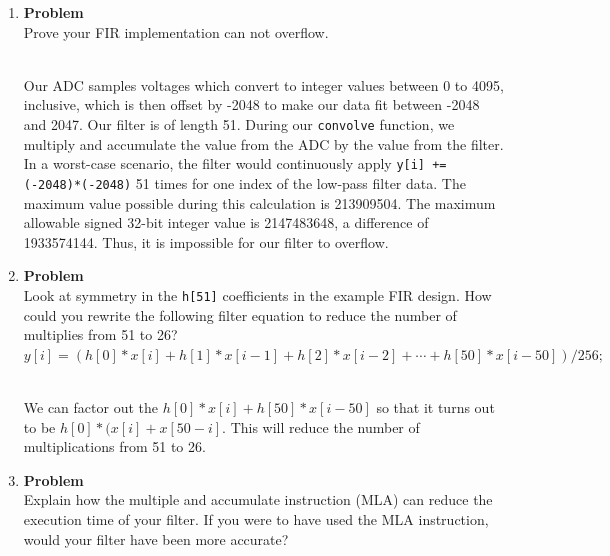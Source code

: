 \documentclass[12pt]{article}
\newenvironment{Ex}{\textbf{Problem}\vspace{.25em}\\}{}
\newcommand{\hbr}{\hfill\vspace{.25em}\\}
\begin{document}
\begin{enumerate}[1)]
\begin{Ex}
\begin{solution}
      No, we did not implement jitter calculation in this lab. There
      should be little to no jitter, as timers are utlized to provide
      adc triggering and each interrupt service routine takes a
      consisten amount of time regardless of the data the ADC is
      sampling. Care was taken to make sure that the ISRs take an
      equal amount of time for this purpose.
    \end{solution}
  \end{Ex}
\item
  \begin{Ex}
    Prove your FIR implementation can not overflow.
    \begin{solution} \hbr
      Our ADC samples voltages which convert to integer values between
      0 to 4095, inclusive, which is then offset by -2048 to make our
      data fit between -2048 and 2047. Our filter is of length
      51. During our \verb|convolve| function, we multiply and
      accumulate the value from the ADC by the value from the
      filter. In a worst-case scenario, the filter would continuously
      apply \verb|y[i] += (-2048)*(-2048)| 51 times for one index of
      the low-pass filter data. The maximum value possible during this
      calculation is 213909504. The maximum allowable signed 32-bit
      integer value is 2147483648, a difference of 1933574144. Thus,
      it is impossible for our filter to overflow.
    \end{solution}
  \end{Ex}
\item
  \begin{Ex}
    Look at symmetry in the \verb|h[51]| coefficients in the example
    FIR design. How could you rewrite the following filter equation to
    reduce the number of multiplies from 51 to 26?
    $y[i]=(h[0]*x[i]+h[1]*x[i-1]+h[2]*x[i-2]+\cdots+h[50]*x[i-50])/256;$
    \begin{solution} \hbr
      We can factor out the $h[0]*x[i] + h[50]*x[i-50]$ so that it
      turns out to be $h[0]*(x[i] + x[50-i]$. This will reduce the
      number of multiplications from 51 to 26.
    \end{solution}
  \end{Ex}
\item
  \begin{Ex}
    Explain how the multiple and accumulate instruction (MLA) can
    reduce the execution time of your filter. If you were to have used
    the MLA instruction, would your filter have been more accurate?


\end{Ex}
\end{enumerate}
\end{document}
